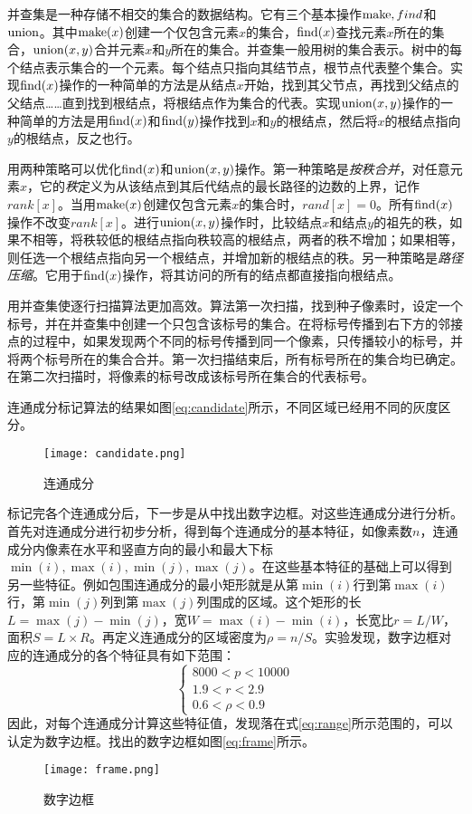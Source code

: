 并查集是一种存储不相交的集合的数据结构。它有三个基本操作$\operatorname{make},find$和$\operatorname{union}$。其中$\operatorname{make}(x)$创建一个仅包含元素$x$的集合，$\operatorname{find}(x)$查找元素$x$所在的集合，$\operatorname{union}(x,y)$合并元素$x$和$y$所在的集合。并查集一般用树的集合表示。树中的每个结点表示集合的一个元素。每个结点只指向其结节点，根节点代表整个集合。实现$\operatorname{find}(x)$操作的一种简单的方法是从结点$x$开始，找到其父节点，再找到父结点的父结点……直到找到根结点，将根结点作为集合的代表。实现$\operatorname{union}(x,y)$操作的一种简单的方法是用$\operatorname{find}(x)$和$\operatorname{find}(y)$操作找到$x$和$y$的根结点，然后将$x$的根结点指向$y$的根结点，反之也行。

用两种策略可以优化$\operatorname{find}(x)$和$\operatorname{union}(x,y)$操作。第一种策略是\emph{按秩合并}，对任意元素$x$，它的\emph{秩}定义为从该结点到其后代结点的最长路径的边数的上界，记作$rank[x]$。当用$\operatorname{make}(x)$创建仅包含元素$x$的集合时，$rand[x]=0$。所有$\operatorname{find}(x)$操作不改变$rank[x]$。进行$\operatorname{union}(x,y)$操作时，比较结点$x$和结点$y$的祖先的秩，如果不相等，将秩较低的根结点指向秩较高的根结点，两者的秩不增加；如果相等，则任选一个根结点指向另一个根结点，并增加新的根结点的秩。另一种策略是\emph{路径压缩}。它用于$\operatorname{find}(x)$操作，将其访问的所有的结点都直接指向根结点。

用并查集使逐行扫描算法更加高效。算法第一次扫描，找到种子像素时，设定一个标号，并在并查集中创建一个只包含该标号的集合。在将标号传播到右下方的邻接点的过程中，如果发现两个不同的标号传播到同一个像素，只传播较小的标号，并将两个标号所在的集合合并。第一次扫描结束后，所有标号所在的集合均已确定。在第二次扫描时，将像素的标号改成该标号所在集合的代表标号。

连通成分标记算法的结果如图\ref{eq:candidate}所示，不同区域已经用不同的灰度区分。
\begin{figure}[h]
  \centering
  \texttt{[image: candidate.png]}
  \caption{连通成分}
  \label{fig:candidate}
\end{figure}


标记完各个连通成分后，下一步是从中找出数字边框。对这些连通成分进行分析。首先对连通成分进行初步分析，得到每个连通成分的基本特征，如像素数$n$，连通成分内像素在水平和竖直方向的最小和最大下标$\min(i),\max(i),\min(j),\max(j)$。在这些基本特征的基础上可以得到另一些特征。例如包围连通成分的最小矩形就是从第$\min(i)$行到第$\max(i)$行，第$\min(j)$列到第$\max(j)$列围成的区域。这个矩形的长$L=\max(j)-\min(j)$，宽$W=\max(i)-\min(i)$，长宽比$r=L/W$，面积$S=L\times R$。再定义连通成分的区域密度为$\rho=n/S$。实验发现，数字边框对应的连通成分的各个特征具有如下范围：
\begin{equation}
  \label{eq:range}
  \begin{cases}
    8000  <  p  <  10000 \\
1.9  <  r  <  2.9 \\
0.6  <  \rho  < 0.9 
  \end{cases}
\end{equation}
因此，对每个连通成分计算这些特征值，发现落在式\eqref{eq:range}所示范围的，可以认定为数字边框。找出的数字边框如图\ref{eq:frame}所示。
\begin{figure}[h]
  \centering
  \texttt{[image: frame.png]}
  \caption{数字边框}
  \label{fig:frame}
\end{figure}

